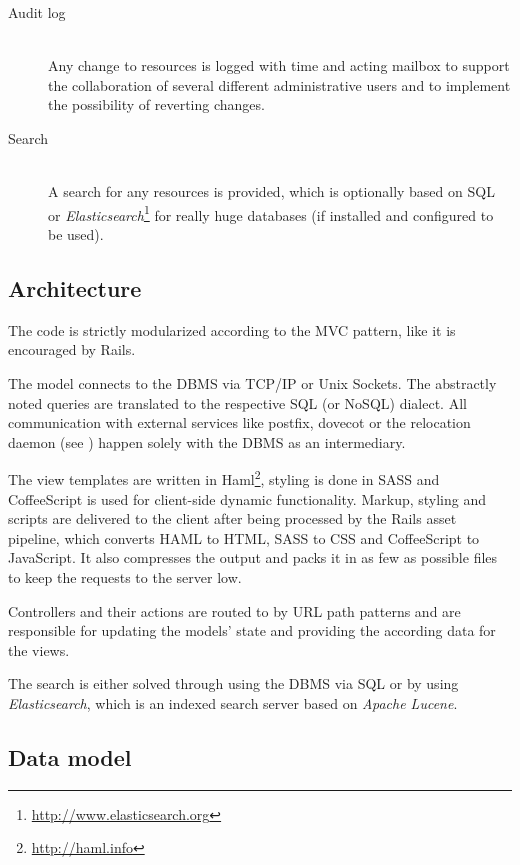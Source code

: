 \documentclass[12pt,a4paper]{scrartcl}
\begin{document}
\begin{description}
				\item[\rm Audit log]\ \\
					Any change to resources is logged with time and acting
					mailbox to support the collaboration of several different
					administrative users and to implement the possibility of
					reverting changes.

				\item[\rm Search]\ \\
					A search for any resources is provided, which is optionally
					based on \ac{SQL} or
					\emph{Elasticsearch}\footnote{\url{http://www.elasticsearch.org}}
					for really huge databases (if installed and configured to
					be used).
			\end{description}

		\subsection*{Architecture}

			The code is strictly modularized according to the \ac{MVC} pattern,
			like it is encouraged by \ac{Rails}.
			
			The model connects to the \ac{DBMS} via TCP/IP or Unix Sockets. The
			abstractly noted queries are translated to the respective \ac{SQL}
			(or NoSQL) dialect. All communication with external services like
			postfix, dovecot or the relocation daemon (see
			) happen solely with the
			\ac{DBMS} as an intermediary.

			The view templates are written in
			Haml\footnote{\url{http://haml.info}}, styling is done in SASS and
			CoffeeScript is used for client-side dynamic functionality. Markup,
			styling and scripts are delivered to the client after being
			processed by the \ac{Rails} asset pipeline, which converts HAML to
			HTML, SASS to CSS and CoffeeScript to JavaScript. It also
			compresses the output and packs it in as few as possible files to
			keep the requests to the server low.

			Controllers and their actions are routed to by URL path patterns
			and are responsible for updating the models' state and providing
			the according data for the views.

			The search is either solved through using the \ac{DBMS} via
			\ac{SQL} or by using \emph{Elasticsearch}, which is an indexed
			search server based on \emph{Apache Lucene}.

		\subsection*{Data model}
\end{document}
